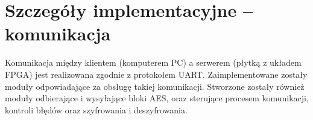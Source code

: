 \section{Szczegóły implementacyjne -- komunikacja}
\label{sec:szczegoly-implementacyjne-uart}
Komunikacja między klientem (komputerem PC) a serwerem (płytką z układem FPGA) jest realizowana zgodnie z protokołem UART. Zaimplementowane zostały moduły odpowiadające za obsługę takiej komunikacji. Stworzone zostały również moduły odbierające i wysyłające bloki AES, oraz sterujące procesem komunikacji, kontroli błędów oraz szyfrowania i deszyfrowania.








